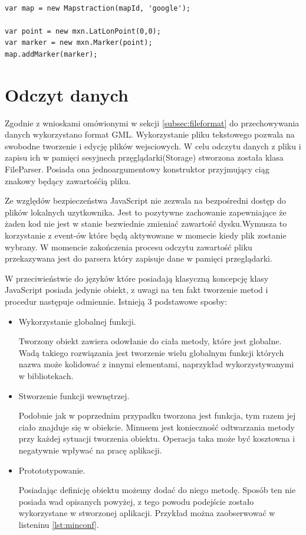 \lstset{language=JavaScript}
\begin{lstlisting}[label={lst:mapstraction},caption={Wykorzystanie Mapstraction.}]

var map = new Mapstraction(mapId, 'google');

var point = new mxn.LatLonPoint(0,0);
var marker = new mxn.Marker(point);
map.addMarker(marker);

\end{lstlisting}

\section{Odczyt danych}
\label{sec:idata}

Zgodnie z wnioskami omówionymi w sekcji \ref{subsec:fileformat} do przechowywania danych wykorzystano format GML. Wykorzystanie pliku tekstowego pozwala na swobodne tworzenie i edycję plików wejsciowych. W celu odczytu  danych z pliku i zapisu ich w pamięci sesyjnech przęglądarki(Storage) stworzona została klasa FileParser. Posiada ona jednoargumentowy konstruktor przyjmujący ciąg znakowy będący zawartośćią pliku.

Ze względów bezpieczeństwa JavaScript nie zezwala na bezpośredni dostęp do plików lokalnych uzytkownika. Jest to pozytywne zachowanie zapewniające że żaden kod nie jest w stanie bezwiednie zmieniać zawartość dysku.Wymusza to korzystanie z event-ów które będą aktywowane w momecie kiedy plik zostanie wybrany. W momencie zakończenia procesu odczytu zawartość pliku przekazywana jest do parsera który zapisuje dane w pamięci przeglądarki.

W przeciwieństwie do języków które posiadają klasyczną koncepcję klasy JavaScript posiada jedynie obiekt, z uwagi na ten fakt tworzenie metod i procedur następuje odmiennie. Istnieją 3 podstawowe sposby:

\begin{itemize}
\item
Wykorzystanie globalnej funkcji.

Tworzony obiekt zawiera odowłanie do ciała metody, które jest globalne. Wadą takiego rozwiązania jest tworzenie wielu globalnym funkcji których nazwa może kolidować z innymi elementami, naprzykład  wykorzystywanymi w bibliotekach.
\item
Stworzenie funkcji wewnętrzej.

Podobnie jak w poprzednim przypadku tworzona jest funkcja, tym razem jej ciało znajduje się w obiekcie. Minusem jest konieczność odtwarzania metody przy każdej sytuacji tworzenia obiektu. Operacja taka może być kosztowna i negatywnie wpływać na pracę aplikacji.
\item
Protototypowanie.

Posiadając definicję obiektu możemy dodać do niego metodę. Sposób ten nie posiada wad opisanych powyżej, z tego powodu podejście zostało wykorzystane w stworzonej aplikacji. Przykład można zaobserwować w listeninu \ref{lst:minconf}.
\end{itemize}

